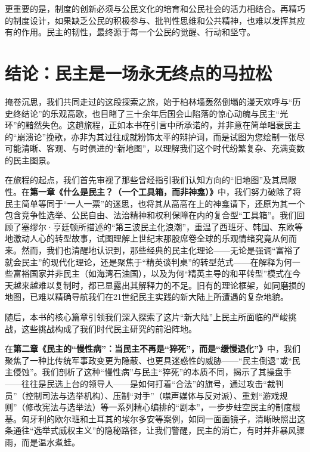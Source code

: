 \documentclass[UTF8, 10pt]{ctexbook}
\begin{document}
更重要的是，制度的创新必须与公民文化的培育和公民社会的活力相结合。再精巧的制度设计，如果缺乏公民的积极参与、批判性思维和公共精神，也难以发挥其应有的作用。民主的韧性，最终源于每一个公民的觉醒、行动和坚守。

\chapter*{结论：民主是一场永无终点的马拉松}

\lettrine[lines=3]{掩}{卷}沉思，我们共同走过的这段探索之旅，始于柏林墙轰然倒塌的漫天欢呼与“历史终结论”的乐观高歌，也目睹了三十余年后国会山陷落的惊心动魄与民主“光环”的黯然失色。这趟旅程，正如本书在引言中所承诺的，并非意在简单唱衰民主的“崩溃论”挽歌，亦非为其过往成就粉饰太平的辩护词，而是试图为您绘制一张尽可能清晰、客观、与时俱进的“新地图”，以理解我们这个时代纷繁复杂、充满变数的民主图景。

在旅程的起点，我们首先审视了那些曾经指引我们认知方向的“旧地图”及其局限性。在\textbf{第一章《什么是民主？（一个工具箱，而非神龛）》}中，我们努力破除了将民主简单等同于“一人一票”的迷思，也将其从高高在上的神龛请下，还原为其一个包含竞争性选举、公民自由、法治精神和权利保障在内的复合型“工具箱”。我们回顾了塞缪尔·亨廷顿所描述的“第三波民主化浪潮”，重温了西班牙、韩国、东欧等地激动人心的转型故事，试图理解上世纪末那股席卷全球的乐观情绪究竟从何而来。然而，我们也清醒地认识到，那些经典的民主化理论——无论是强调“富裕了就会民主”的现代化理论，还是聚焦于“精英谈判桌”的转型范式——在解释为何一些富裕国家并非民主（如海湾石油国），以及为何“精英主导的和平转型”模式在今天越来越难以复制时，都已显露出其解释力的不足。旧有的理论框架，如同磨损的地图，已难以精确导航我们在21世纪民主实践的新大陆上所遭遇的复杂地貌。

随后，本书的核心篇章引领我们深入探索了这片“新大陆”上民主所面临的严峻挑战，这些挑战构成了我们时代民主研究的前沿阵地。

在\textbf{第二章《民主的“慢性病”：当民主不再是“猝死”，而是“缓慢退化”》}中，我们聚焦了一种比传统军事政变更为隐蔽、也更具迷惑性的威胁——“民主倒退”或“民主侵蚀”。我们剖析了这种“慢性病”与民主“猝死”的本质不同，揭示了其操盘手——往往是民选上台的领导人——是如何打着“合法”的旗号，通过攻击“裁判员”（控制司法与选举机构）、压制“对手”（噤声媒体与反对派）、重划“游戏规则”（修改宪法与选举法）等一系列精心编排的“剧本”，一步步蛀空民主的制度根基。匈牙利的欧尔班和土耳其的埃尔多安等案例，如同一面面镜子，清晰映照出这条通往“选举式威权主义”的隐秘路径，让我们警醒，民主的消亡，有时并非暴风骤雨，而是温水煮蛙。
\end{document}

